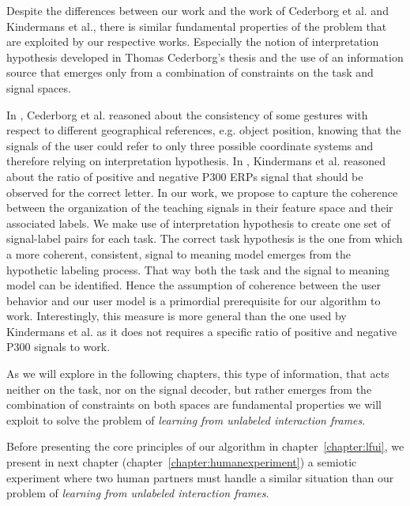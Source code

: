 Despite the differences between our work and the work of Cederborg et al. and Kindermans et al., there is similar fundamental properties of the problem that are exploited by our respective works. Especially the notion of interpretation hypothesis developed in Thomas Cederborg's thesis and the use of an information source that emerges only from a combination of constraints on the task and signal spaces. 

In \cite{cederborg2011imitating}, Cederborg et al. reasoned about the consistency of some gestures with respect to different geographical references, e.g. object position, knowing that the signals of the user could refer to only three possible coordinate systems and therefore relying on interpretation hypothesis. In \cite{Kindermans2012a,kindermans2014true}, Kindermans et al. reasoned about the ratio of positive and negative P300 ERPs signal that should be observed for the correct letter. In our work, we propose to capture the coherence between the organization of the teaching signals in their feature space and their associated labels. We make use of interpretation hypothesis to create one set of signal-label pairs for each task. The correct task hypothesis is the one from which a more coherent, consistent, signal to meaning model emerges from the hypothetic labeling process. That way both the task and the signal to meaning model can be identified. Hence the assumption of coherence between the user behavior and our user model is a primordial prerequisite for our algorithm to work. Interestingly, this measure is more general than the one used by Kindermans et al. as it does not requires a specific ratio of positive and negative P300 signals to work.

As we will explore in the following chapters, this type of information, that acts neither on the task, nor on the signal decoder, but rather emerges from the combination of constraints on both spaces are fundamental properties we will exploit to solve the problem of \emph{learning from unlabeled interaction frames}.

\transition

Before presenting the core principles of our algorithm in chapter~\ref{chapter:lfui}, we present in next chapter (chapter~\ref{chapter:humanexperiment}) a semiotic experiment where two human partners must handle a similar situation than our problem of \emph{learning from unlabeled interaction frames}.
